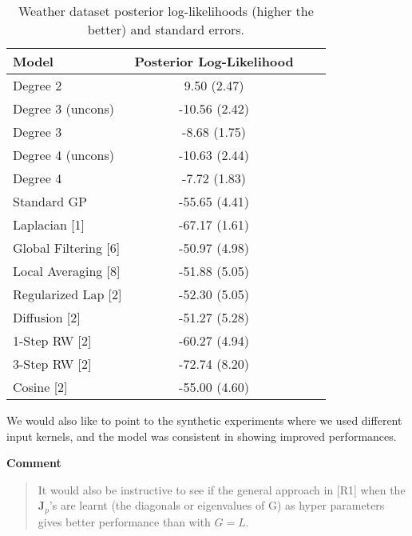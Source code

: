 \documentclass[11pt,onecolumn,journal]{IEEEtran}
\theoremstyle{definition}
\begin{document}
\begin{table}[h]
  \caption{Weather dataset posterior log-likelihoods (higher the better) and standard errors.}\label{predictive_syn}
  \centering
  \tabcolsep=0.1cm
  \begin{tabular}{lccc}
    \hline
\textbf{Model} & \textbf{ Posterior Log-Likelihood }\\
\hline
Degree 2 & 9.50 (2.47) \\
Degree 3 (uncons) & -10.56 (2.42) \\
Degree 3 & -8.68 (1.75) \\
Degree 4 (uncons) & -10.63 (2.44)\\
Degree 4 & -7.72 (1.83) \\
\hline
Standard GP & -55.65 (4.41) \\
Laplacian [1] & -67.17 (1.61) \\
Global Filtering [6] & -50.97 (4.98) \\
Local Averaging [8] & -51.88 (5.05) \\

Regularized Lap [2] & -52.30 (5.05) \\

Diffusion [2] & -51.27 (5.28) \\

1-Step RW [2] & -60.27 (4.94) \\

3-Step RW [2] & -72.74 (8.20) \\

Cosine [2] & -55.00 (4.60) \\
    \hline
\end{tabular}%
\end{table}

We would also like to point to the synthetic experiments where we used different input kernels, and the model was consistent in showing improved performances.



\textbf{Comment}
\begin{quote}
    It would also be instructive to see if the general approach in [R1] when the $\mathbf{J}_p$’s are learnt (the diagonals or eigenvalues of G) as hyper parameters gives better performance than with $G=L$.
\end{quote}
\end{document}
